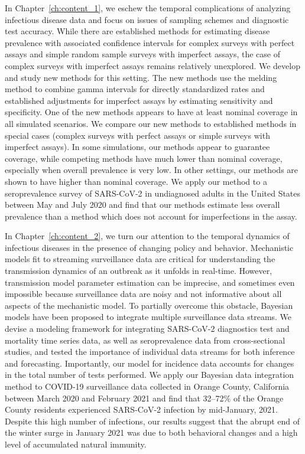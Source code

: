 In Chapter~\ref{ch:content_1}, we eschew the temporal complications of analyzing infectious disease data and focus on issues of sampling schemes and diagnostic test accuracy.
While there are established methods for estimating disease prevalence with associated confidence intervals for complex surveys with perfect assays and simple random sample surveys with imperfect assays, the case of complex surveys with imperfect assays remains relatively unexplored.
We develop and study new methods for this setting.
The new methods use the melding method to combine gamma intervals for directly standardized rates and established adjustments for imperfect assays by estimating sensitivity and specificity.
One of the new methods appears to have at least nominal coverage in all simulated scenarios.
We compare our new methods to established methods in special cases (complex surveys with perfect
assays or simple surveys with imperfect assays).
In some simulations, our methods appear to guarantee coverage, while competing methods have much lower than nominal coverage, especially when overall prevalence is very low.
In other settings, our methods are shown to have higher than nominal coverage.
We apply our method to a seroprevalence survey of SARS-CoV-2 in undiagnosed adults in the United States between May and July 2020 and find that our methods estimate less overall prevalence than a method which does not account for imperfections in the assay.

In Chapter~\ref{ch:content_2}, we turn our attention to the temporal dynamics of infectious diseases in the presence of changing policy and behavior.
Mechanistic models fit to streaming surveillance data are critical for understanding the transmission dynamics of an outbreak as it unfolds in real-time.
However, transmission model parameter estimation can be imprecise, and sometimes even impossible because surveillance data are noisy and not informative about all aspects of the mechanistic model.
To partially overcome this obstacle, Bayesian models have been proposed to integrate multiple surveillance data streams. 
We devise a modeling framework for integrating SARS-CoV-2 diagnostics test and mortality time series data, as well as seroprevalence data from cross-sectional studies, and tested the importance of individual data streams for both inference and forecasting.
Importantly, our model for incidence data accounts for changes in the total number of tests performed.
We apply our Bayesian data integration method to COVID-19 surveillance data collected in Orange County, California between March 2020 and February 2021 and find that 32--72\% of the Orange County residents experienced SARS-CoV-2 infection by mid-January, 2021.
Despite this high number of infections, our results suggest that the abrupt end of the winter surge in January 2021 was due to both behavioral changes and a high level of accumulated natural immunity.

